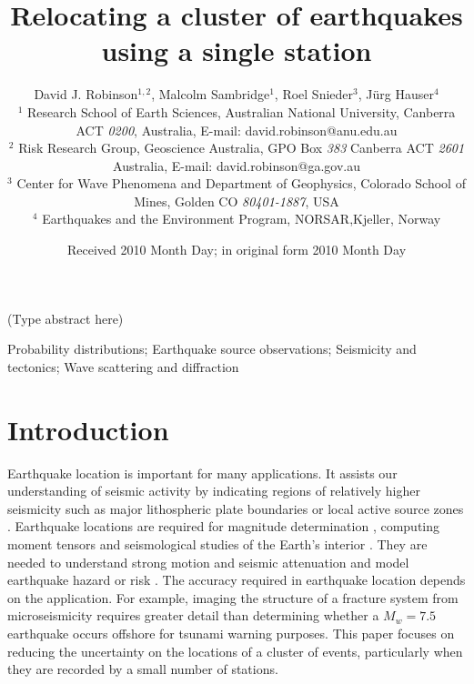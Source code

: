 \documentclass[extra]{gji}
\title{Relocating a cluster of earthquakes using a single station}
\author[D.J. Robinson, M. Sambridge, R. Snieder and J Hauser]
  {David J. Robinson$^{1,2}$, Malcolm Sambridge$^{1}$, Roel Snieder$^{3}$, J\"urg Hauser$^{4}$ \\
  $^1$ Research School of Earth Sciences, Australian National
    University, Canberra ACT \emph{0200}, Australia, E-mail: david.robinson@anu.edu.au \\
$^2$  Risk Research Group, Geoscience Australia, GPO Box \emph{383} Canberra ACT \emph{2601} Australia, E-mail: david.robinson@ga.gov.au\\
$^3$ Center for Wave Phenomena and Department of Geophysics, Colorado School of Mines, Golden CO \emph{80401-1887}, USA \\
$^4$ Earthquakes and the Environment Program, NORSAR,Kjeller, Norway}
\date{Received 2010 Month Day; in original form 2010 Month Day}
\begin{document}
\label{firstpage}

\maketitle


\begin{summary}
(Type abstract here)
\end{summary}

\begin{keywords}
 Probability distributions; Earthquake source observations; Seismicity and tectonics; Wave scattering and diffraction
\end{keywords}

\section{Introduction}

Earthquake location is important for many applications. It assists
our understanding of seismic activity by indicating regions of
relatively higher seismicity such as major lithospheric plate
boundaries \citep[e.g., ][]{dr_Sykes67a, dr_Isacks68a,
dr_Stein02a} or local active source zones
\citep[e.g., ][]{dr_Gutenberg44a, dr_Giardini03a}.
Earthquake locations are required for  magnitude determination
\citep[e.g., ][]{dr_Richter35a, dr_Gutenberg45a}, computing
moment tensors \citep[e.g., ][]{dr_Sipkin02a} and
seismological studies of the Earth's interior
\citep[e.g., ][]{dr_Spencer80a, dr_Kennett95a, dr_Curtis02a,
dr_Kennett04a}. They are needed to
understand strong motion and seismic attenuation
\citep[e.g., ][]{dr_Toro97a, dr_Campbell03a}
 and model earthquake hazard or risk
\citep[e.g., ][]{dr_Frankel00a, dr_Stirling02a, dr_Robinson06b}.
The accuracy required in earthquake location depends on the application.
For example, imaging the structure of a fracture system from microseismicity
requires greater detail than determining whether a $M_w=7.5$ earthquake
occurs offshore for tsunami warning purposes. This paper focuses
on reducing the uncertainty on the locations of a cluster of events, particularly
when they are recorded by a small number of stations.
\end{document}
